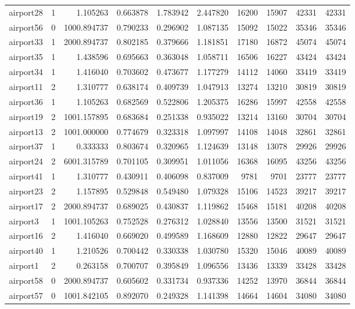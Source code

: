\begin{longtable}{|l|r|r|r|r|r|r|r|r|r|}
airport28 & 1 & 1.105263 & 0.663878 & 1.783942 & 2.447820 & 16200 & 15907 & 42331 & 42331 \\
airport56 & 0 & 1000.894737 & 0.790233 & 0.296902 & 1.087135 & 15092 & 15022 & 35346 & 35346 \\
airport33 & 1 & 2000.894737 & 0.802185 & 0.379666 & 1.181851 & 17180 & 16872 & 45074 & 45074 \\
airport35 & 1 & 1.438596 & 0.695663 & 0.363048 & 1.058711 & 16506 & 16227 & 43424 & 43424 \\
airport34 & 1 & 1.416040 & 0.703602 & 0.473677 & 1.177279 & 14112 & 14060 & 33419 & 33419 \\
airport11 & 2 & 1.310777 & 0.638174 & 0.409739 & 1.047913 & 13274 & 13210 & 30819 & 30819 \\
airport36 & 1 & 1.105263 & 0.682569 & 0.522806 & 1.205375 & 16286 & 15997 & 42558 & 42558 \\
airport19 & 2 & 1001.157895 & 0.683684 & 0.251338 & 0.935022 & 13214 & 13160 & 30704 & 30704 \\
airport13 & 2 & 1001.000000 & 0.774679 & 0.323318 & 1.097997 & 14108 & 14048 & 32861 & 32861 \\
airport37 & 1 & 0.333333 & 0.803674 & 0.320965 & 1.124639 & 13148 & 13078 & 29926 & 29926 \\
airport24 & 2 & 6001.315789 & 0.701105 & 0.309951 & 1.011056 & 16368 & 16095 & 43256 & 43256 \\
airport41 & 1 & 1.310777 & 0.430911 & 0.406098 & 0.837009 & 9781 & 9701 & 23777 & 23777 \\
airport23 & 2 & 1.157895 & 0.529848 & 0.549480 & 1.079328 & 15106 & 14523 & 39217 & 39217 \\
airport17 & 2 & 2000.894737 & 0.689025 & 0.430837 & 1.119862 & 15468 & 15181 & 40208 & 40208 \\
airport3 & 1 & 1001.105263 & 0.752528 & 0.276312 & 1.028840 & 13556 & 13500 & 31521 & 31521 \\
airport16 & 2 & 1.416040 & 0.669020 & 0.499589 & 1.168609 & 12880 & 12822 & 29647 & 29647 \\
airport40 & 1 & 1.210526 & 0.700442 & 0.330338 & 1.030780 & 15320 & 15046 & 40089 & 40089 \\
airport1 & 2 & 0.263158 & 0.700707 & 0.395849 & 1.096556 & 13436 & 13339 & 33428 & 33428 \\
airport58 & 0 & 2000.894737 & 0.605602 & 0.331734 & 0.937336 & 14252 & 13970 & 36844 & 36844 \\
airport57 & 0 & 1001.842105 & 0.892070 & 0.249328 & 1.141398 & 14664 & 14604 & 34080 & 34080 \\

\end{longtable}
